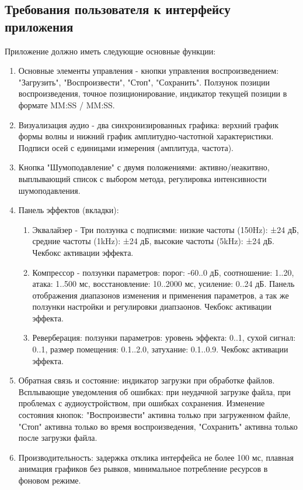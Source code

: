 
\subsection{Требования пользователя к интерфейсу приложения}

Приложение должно иметь следующие основные функции:
\begin{enumerate}
	\item Основные элементы управления - кнопки управления воспроизведением: "Загрузить", "Воспроизвести", "Стоп", "Сохранить". Ползунок позиции воспроизведения, точное позиционирование, индикатор текущей позиции в формате MM:SS / MM:SS.
	\item Визуализация аудио - два синхронизированных графика: верхний график формы волны и нижний график амплитудно-частотной характеристики. Подписи осей с единицами измерения (амплитуда, частота).
	\item Кнопка "Шумоподавление" с двумя положениями: активно/неакитвно, выплывающий список с выбором метода, регулировка интенсивности шумоподавления.
	\item Панель эффектов (вкладки):
	\begin{enumerate}
		\item Эквалайзер - Три ползунка с подписями: низкие частоты (150Hz): ±24 дБ, средние частоты (1kHz): ±24 дБ, высокие частоты (5kHz): ±24 дБ. Чекбокс активации эффекта.
		\item Компрессор - ползунки параметров: порог: -60..0 дБ, соотношение: 1..20, атака: 1..500 мс, восстановление: 10..2000 мс, усиление: 0..24 дБ. Панель отображения диапазонов изменения и применения параметров, а так же ползунки настройки и регулировки диапзаонов. Чекбокс активации эффекта. 
		\item Реверберация: ползунки параметров: уровень эффекта: 0..1, сухой сигнал: 0..1, размер помещения: 0.1..2.0, затухание: 0.1..0.9. Чекбокс активации эффекта.
	\end{enumerate}	
	\item Обратная связь и состояние: индикатор загрузки при обработке файлов. Всплывающие уведомления об ошибках: при неудачной загрузке файла, при проблемах с аудиоустройством, при ошибках сохранения. Изменение состояния кнопок: "Воспроизвести" активна только при загруженном файле, "Стоп" активна только во время воспроизведения, "Сохранить" активна только после загрузки файла.
	\item Производительность: задержка отклика интерфейса не более 100 мс, плавная анимация графиков без рывков, минимальное потребление ресурсов в фоновом режиме.
\end{enumerate}	

